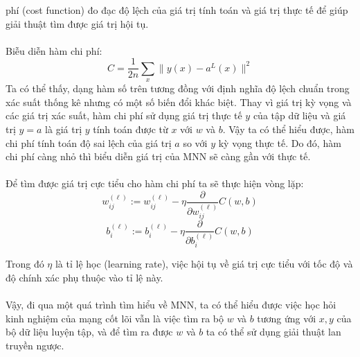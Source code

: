phí (cost function) đo đạc độ lệch của giá trị tính toán và giá trị thực tế 
để giúp giải thuật tìm được giá trị hội tụ.\\\\
Biễu diễn hàm chi phí:\\
\[
  C=\frac{1}{2n}\sum_x\|y(x)-a^L(x)\|^2
\]
Ta có thể thấy, dạng hàm số trên tương đồng với định nghĩa độ lệch chuẩn trong 
xác suất thống kê nhưng có một số biến đổi khác biệt. Thay vì giá trị kỳ vọng 
và các giá trị xác suất, hàm chi phí sử dụng giá trị thực tế $y$ của tập dữ 
liệu và giá trị $y=a$ là giá trị $y$ tính toán được từ $x$ với $w$ và $b$. Vậy 
ta có thể hiểu được, hàm chi phí tính toán độ sai lệch của giá trị $a$ so với 
$y$ kỳ vọng thực tế. Do đó, hàm chi phí càng nhỏ thì biểu diễn giá trị của 
MNN sẽ càng gần với thực tế.\\\\
Để tìm được giá trị cực tiểu cho hàm chi phí ta sẽ thực hiện vòng lặp:\\
\[
  w_{ij}^{(\ell)}:=w_{ij}^{(\ell)}-\eta\frac{\partial}{\partial w_{ij}^{(\ell)}}C(w,b)
\]
\[
  b_i^{(\ell)}:=b_i^{(\ell)}-\eta\frac{\partial}{\partial b_i^{(\ell)}}C(w,b)
\]

Trong đó $\eta$ là tỉ lệ học (learning rate), việc hội tụ về giá trị cực tiểu 
với tốc độ và độ chính xác phụ thuộc vào tỉ lệ này.\\\\
Vậy, đi qua một quá trình tìm hiểu về MNN, ta có thể hiểu được việc học hỏi 
kinh nghiệm của mạng cốt lõi vẫn là việc tìm ra bộ $w$ và $b$ tương ứng với 
${x, y}$ của bộ dữ liệu luyện tập, và để tìm ra được $w$ và $b$ ta có thể sử 
dụng giải thuật lan truyền ngược.